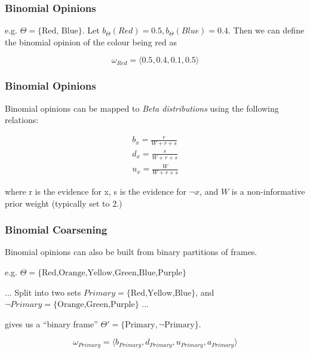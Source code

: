 \documentclass{beamer}
\begin{document}

\begin{frame}
\frametitle{Binomial Opinions}

e.g. $\Theta = \lbrace \mbox{Red, Blue} \rbrace$.
Let $b_\Theta\left(Red\right) = 0.5, b_\Theta\left(Blue\right) = 0.4$. Then we can
define the binomial opinion of the colour being red as

$$
\omega_{Red} = \langle 0.5, 0.4, 0.1, 0.5 \rangle
$$

\end{frame}


\begin{frame}
\frametitle{Binomial Opinions}

Binomial opinions can be mapped to \emph{Beta distributions} using the following relations:

$$
\begin{array}{l}
  b_x = \frac{r}{W + r + s} \\
  d_x = \frac{s}{W + r + s} \\
  u_x = \frac{W}{W + r + s}
\end{array}
$$

where r is the evidence for x, s is the evidence for $\lnot x$, and
$W$ is a non-informative prior weight (typically set to 2.)

\end{frame}


\begin{frame}
\frametitle{Binomial Coarsening}

Binomial opinions can also be built from binary partitions of frames.

e.g. $\Theta = \lbrace \mbox{Red,Orange,Yellow,Green,Blue,Purple} \rbrace$

... Split into two sets $Primary = \lbrace \mbox{Red,Yellow,Blue} \rbrace$, and
$\lnot Primary = \lbrace \mbox{Orange,Green,Purple} \rbrace$ ...

gives us a ``binary frame'' $\Theta' = \lbrace \mbox{Primary}, \lnot \mbox{Primary} \rbrace$.

$$
\omega_{Primary} = \langle b_{Primary}, d_{Primary}, u_{Primary}, a_{Primary} \rangle
$$

\end{frame}
\end{document}
